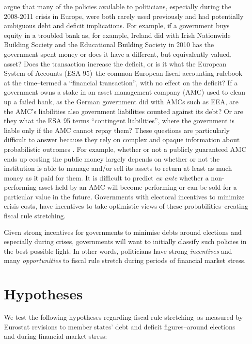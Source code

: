 \documentclass[]{article}
\begin{document}
\cite{GandrudHallerberg2016} argue that many of the policies available to politicians, especially during the 2008-2011 crisis in Europe, were both rarely used previously and had potentially ambiguous debt and deficit implications. For example, if a government buys equity in a troubled bank as, for example, Ireland did with Irish Nationwide Building Society and the Educational Building Society in 2010 has the government spent money or does it have a different, but equivalently valued, asset? Does the transaction increase the deficit, or is it what the European System of Accounts (ESA 95)--the common European fiscal accounting rulebook at the time--termed a ``financial transaction'', with no effect on the deficit? If a government owns a stake in an asset management company (AMC) used to clean up a failed bank, as the German government did with AMCs such as EEA, are the AMC's liabilities also government liabilities counted against its debt? Or are they what the ESA 95 terms ``contingent liabilities'', where the government is liable only if the AMC cannot repay them? These questions are particularly difficult to answer because they rely on complex and opaque information about probabilistic outcomes \citep{gandrudOkeeffe2016}. For example, whether or not a publicly guaranteed AMC ends up costing the public money largely depends on whether or not the institution is able to manage and/or sell its assets to return at least as much money as it paid for them. It is difficult to predict \emph{ex ante} whether a non-performing asset held by an AMC will become performing or can be sold for a particular value in the future. Governments with electoral incentives to minimize crisis costs, have incentives to take optimistic views of these probabilities--creating fiscal rule stretching.

Given strong incentives for governments to minimise debts around elections and especially during crises, governments will want to initially classify such policies in the best possible light. In other words, politicians have strong \emph{incentives} and many \emph{opportunities} to fiscal rule stretch during periods of financial market stress.

\section{Hypotheses}

We test the following hypotheses regarding fiscal rule stretching--as measured by Eurostat revisions to member states' debt and deficit figures--around elections and during financial market stress:
\end{document}
